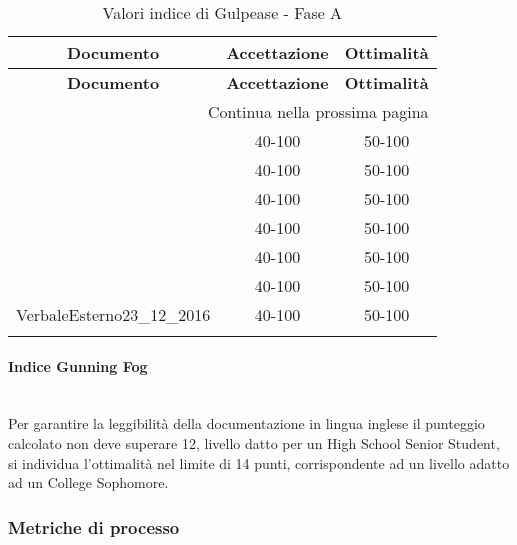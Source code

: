 \begin{longtable}{|c|c|c|}
	\hline \multicolumn{1}{|c|}{\textbf{Documento}} & \multicolumn{1}{c|}{\textbf{Accettazione}} & \multicolumn{1}{c|}{\textbf{Ottimalità}} \\
	\hline 
	\endfirsthead
	
	\hline \multicolumn{1}{|c|}{\textbf{Documento}} & \multicolumn{1}{c|}{\textbf{Accettazione}} & \multicolumn{1}{c|}{\textbf{Ottimalità}} \\
	\hline 
	\endhead
	
	\hline \multicolumn{3}{|r|}{{Continua nella prossima pagina}} \\ 
	\hline
	\endfoot
	
	\hline
	\endlastfoot
	
	\hline \NormeDiProgetto{}  & 40-100 & 50-100 \\
	\hline \StudioDiFattibilita{}  & 40-100 & 50-100  \\
	\hline \PianoDiProgetto{}  & 40-100 & 50-100  \\
	\hline \PianoDiQualifica{}  & 40-100 & 50-100  \\
	\hline \AnalisiDeiRequisiti{}  & 40-100 & 50-100  \\
	\hline \Glossario{}  & 40-100 & 50-100  \\
	\hline VerbaleEsterno23\_12\_2016 & 40-100 & 50-100 \\
	\hline
	\caption{Valori indice di Gulpease - Fase A}
\end{longtable}

\paragraph{Indice Gunning Fog}\mbox{}\\
Per garantire la leggibilità della documentazione in lingua inglese il punteggio calcolato non deve superare 12, livello datto per un High School Senior Student, si individua l'ottimalità nel limite di 14 punti, corrispondente ad un livello adatto ad un College Sophomore.

\subsubsection{Metriche di processo}\label{sec:metriche_processo}
